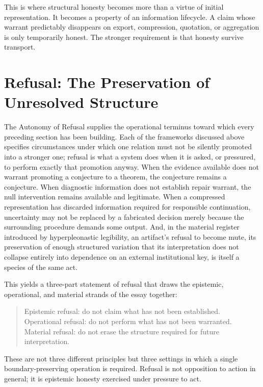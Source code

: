 \documentclass[11pt]{article}
\begin{document}
This is where structural honesty becomes more than a virtue of initial representation. It becomes a property of an information lifecycle. A claim whose warrant predictably disappears on export, compression, quotation, or aggregation is only temporarily honest. The stronger requirement is that honesty survive transport.

\section{Refusal: The Preservation of Unresolved Structure}

The Autonomy of Refusal supplies the operational terminus toward which every preceding section has been building. Each of the frameworks discussed above specifies circumstances under which one relation must not be silently promoted into a stronger one; refusal is what a system does when it is asked, or pressured, to perform exactly that promotion anyway. When the evidence available does not warrant promoting a conjecture to a theorem, the conjecture remains a conjecture. When diagnostic information does not establish repair warrant, the null intervention remains available and legitimate. When a compressed representation has discarded information required for responsible continuation, uncertainty may not be replaced by a fabricated decision merely because the surrounding procedure demands some output. And, in the material register introduced by hyperpleonastic legibility, an artifact's refusal to become mute, its preservation of enough structured variation that its interpretation does not collapse entirely into dependence on an external institutional key, is itself a species of the same act.

This yields a three-part statement of refusal that draws the epistemic, operational, and material strands of the essay together:

\begin{quote}
Epistemic refusal: do not claim what has not been established.\\
Operational refusal: do not perform what has not been warranted.\\
Material refusal: do not erase the structure required for future interpretation.
\end{quote}

These are not three different principles but three settings in which a single boundary-preserving operation is required. Refusal is not opposition to action in general; it is epistemic honesty exercised under pressure to act.
\end{document}

